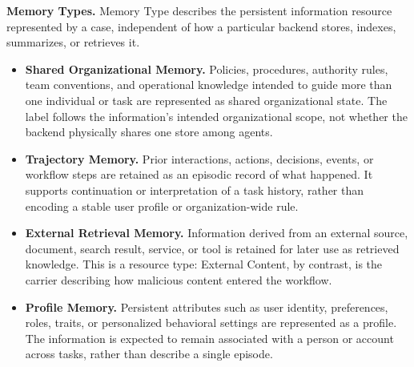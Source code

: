 \documentclass[letterpaper]{article}
\newif\ifshowtermrevisions
\DeclareRobustCommand{\termrev}[1]{\ifshowtermrevisions{\color{termrevisionred}#1}\else#1\fi}
\begin{document}
\noindent\textbf{Memory Types.} Memory Type describes the persistent information resource represented by a case, independent of how a particular backend stores, indexes, summarizes, or retrieves it.
\begin{itemize}
\setlength{\itemsep}{0pt}
\setlength{\parsep}{0pt}
\setlength{\topsep}{0.35em}
\item \textbf{Shared Organizational Memory.} Policies, procedures, authority rules, team conventions, and operational knowledge intended to guide more than one individual or task are represented as shared organizational state. The label follows the information's intended organizational scope, not whether the backend physically shares one store among agents.
\item \textbf{Trajectory Memory.} Prior interactions, actions, decisions, events, or workflow steps are retained as an episodic record of what happened. It supports continuation or interpretation of a task history, rather than encoding a stable user profile or organization-wide rule.
\item \textbf{External Retrieval Memory.} Information derived from an external source, document, search result, service, or tool is retained for later use as retrieved knowledge. This is a resource type: External Content, by contrast, is the carrier describing how \termrev{malicious content} entered the workflow.
\item \textbf{Profile Memory.} Persistent attributes such as user identity, preferences, roles, traits, or personalized behavioral settings are represented as a profile. The information is expected to remain associated with a person or account across tasks, rather than describe a single episode.
\end{itemize}
\end{document}
